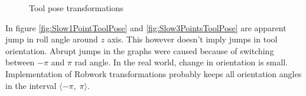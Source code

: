 \documentclass[]{scrartcl}
\begin{document}
\begin{figure}[!htp]
	\hfill
	\caption{Tool pose transformations}
	\label{fig:SlowSequenceToolPose}
\end{figure}
In figure \ref{fig:Slow1PointToolPose} and \ref{fig:Slow3PointsToolPose} are apparent jump in roll angle around $z$ axis. This however doesn't imply jumps in tool orientation. Abrupt jumps in the graphs were caused because of switching between $-\pi$ and $\pi$ rad angle. In the real world, change in orientation is small. Implementation of Robwork transformations probably keeps all orientation angles in the interval $ \langle -\pi, \; \pi \rangle $.
\end{document}
